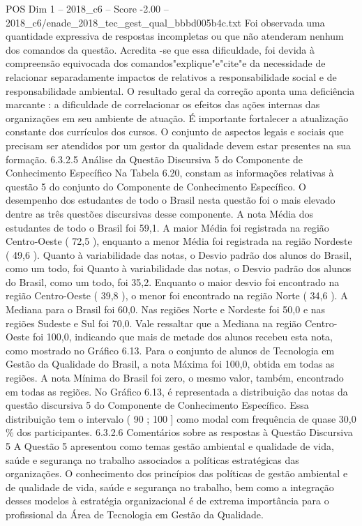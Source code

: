 \begin{textsample}{POS Dim 1 – 2018\_c6 – Score -2.00 – 2018\_c6/enade\_2018\_tec\_gest\_qual\_bbbd005b4c.txt}
Foi observada uma quantidade expressiva de respostas incompletas ou que não atenderam nenhum dos comandos da questão.
Acredita -se que essa dificuldade, foi devida à compreensão equivocada dos comandos"explique"e"cite"e da necessidade de relacionar separadamente impactos de relativos a responsabilidade social e de responsabilidade ambiental.
O resultado geral da correção aponta uma deficiência marcante : a dificuldade de correlacionar os efeitos das ações internas das organizações em seu ambiente de atuação.
É importante fortalecer a atualização constante dos currículos dos cursos.
O conjunto de aspectos legais e sociais que precisam ser atendidos por um gestor da qualidade devem estar presentes na sua formação. 6.3.2.5 Análise da Questão Discursiva 5 do Componente de Conhecimento Específico Na Tabela 6.20, constam as informações relativas à questão 5 do conjunto do Componente de Conhecimento Específico.
O desempenho dos estudantes de todo o Brasil nesta questão foi o mais elevado dentre as três questões discursivas desse componente.
A nota Média dos estudantes de todo o Brasil foi 59,1.
A maior Média foi registrada na região Centro-Oeste ( 72,5 ), enquanto a menor Média foi registrada na região Nordeste ( 49,6 ).
Quanto à variabilidade das notas, o Desvio padrão dos alunos do Brasil, como um todo, foi Quanto à variabilidade das notas, o Desvio padrão dos alunos do Brasil, como um todo, foi 35,2.
Enquanto o maior desvio foi encontrado na região Centro-Oeste ( 39,8 ), o menor foi encontrado na região Norte ( 34,6 ).
A Mediana para o Brasil foi 60,0.
Nas regiões Norte e Nordeste foi 50,0 e nas regiões Sudeste e Sul foi 70,0.
Vale ressaltar que a Mediana na região Centro-Oeste foi 100,0, indicando que mais de metade dos alunos recebeu esta nota, como mostrado no Gráfico 6.13.
Para o conjunto de alunos de Tecnologia em Gestão da Qualidade do Brasil, a nota Máxima foi 100,0, obtida em todas as regiões.
A nota Mínima do Brasil foi zero, o mesmo valor, também, encontrado em todas as regiões.
No Gráfico 6.13, é representada a distribuição das notas da questão discursiva 5 do Componente de Conhecimento Específico.
Essa distribuição tem o intervalo ( 90 ; 100 ] como modal com frequência de quase 30,0 \% dos participantes. 6.3.2.6 Comentários sobre as respostas à Questão Discursiva 5 A Questão 5 apresentou como temas gestão ambiental e qualidade de vida, saúde e segurança no trabalho associados a políticas estratégicas das organizações.
O conhecimento dos princípios das políticas de gestão ambiental e de qualidade de vida, saúde e segurança no trabalho, bem como a integração desses modelos à estratégia organizacional é de extrema importância para o profissional da Área de Tecnologia em Gestão da Qualidade.

\end{textsample}
